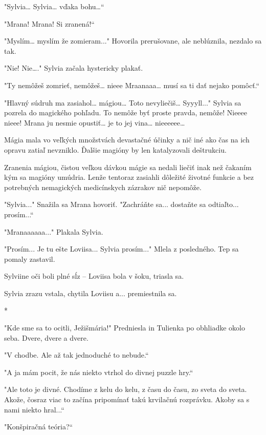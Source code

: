 \documentclass{book}
\begin{document}
"$ $Sylvia… Sylvia… vďaka bohu…“

"$ $Mrana! Mrana! Si zranená!“

"$ $Myslím… myslím že zomieram..."$ $ Hovorila prerušovane, ale neblúznila, nezdalo sa tak.

"$ $Nie! Nie…."$ $ Sylvia začala hystericky plakať.

"$ $Ty nemôžeš zomrieť, nemôžeš… nieee Mraanaaa… musí sa ti dať nejako pomôcť.“

"$ $Hlavný súdruh ma zasiahol… mágiou… Toto nevyliečiš… Syyyll..."$ $ Sylvia sa pozrela do magického pohľadu. To nemôže byť proste pravda, nemôže! Nieeee nieee! Mrana ju nesmie opustiť… je to jej vina… nieeeeee…

Mágia mala vo veľkých množstvách devastačné účinky a nič iné ako čas na ich opravu zatiaľ nevzniklo. Ďalšie magióny by len katalyzovali deštrukciu.

Zranenia mágiou, čistou veľkou dávkou mágie sa nedali liečiť inak než čakaním kým sa magióny umúdria. Lenže tentoraz zasiahli dôležité životné funkcie a bez potrebných nemagických medicínskych zázrakov nič nepomôže.

"$ $Sylvia..."$ $ Snažila sa Mrana hovoriť. "$ $Zachráňte sa... dostaňte sa odtiaľto... prosím...“

"$ $Mranaaaaaa..."$ $ Plakala Sylvia.

"$ $Prosím... Je tu ešte Loviisa... Sylvia prosím..."$ $ Mlela z posledného. Tep sa pomaly zastavil.

Sylviine oči boli plné sĺz – Loviisa bola v šoku, triasla sa.

Sylvia zrazu vstala, chytila Loviisu a... premiestnila sa.



\begin{center}
*
\end{center}



"$ $Kde sme sa to ocitli, Ježišmária!"$ $ Predniesla in Tulienka po obhliadke okolo seba. Dvere, dvere a dvere.

"$ $V chodbe. Ale až tak jednoduché to nebude.“

"$ $A ja mám pocit, že nás niekto vtrhol do divnej puzzle hry.“

"$ $Ale toto je divné. Chodíme z kelu do kelu, z času do času, zo sveta do sveta. Akože, čosraz viac to začína pripomínať takú krvilačnú rozprávku. Akoby sa s nami niekto hral...“

"$ $Konšpiračná teória?“
\end{document}

